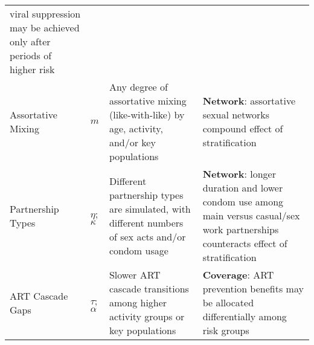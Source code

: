 \begin{tabular}{llp{.35\linewidth}p{.4\linewidth}}
  viral suppression may be achieved only after periods of higher risk
\\
  Assortative Mixing
& $m$
& Any degree of assortative mixing (like-with-like) by age, activity, and/or key populations
& \textbf{Network}: assortative sexual networks compound effect of stratification \cite{Anderson1991}
\\
  Partnership Types
& $\eta$; $\kappa$
& Different partnership types are simulated, with different numbers of sex acts and/or condom usage \cite{Scorgie2012}
& \textbf{Network}: longer duration and lower condom use among main versus casual/sex work partnerships
  counteracts effect of stratification
\\
  ART Cascade Gaps
& $\tau$; $\alpha$
& Slower ART cascade transitions among higher activity groups or key populations \cite{Hakim2018,Green2020}
& \textbf{Coverage}: ART prevention benefits may be allocated differentially among risk groups
\\
\bottomrule
\end{tabular}
